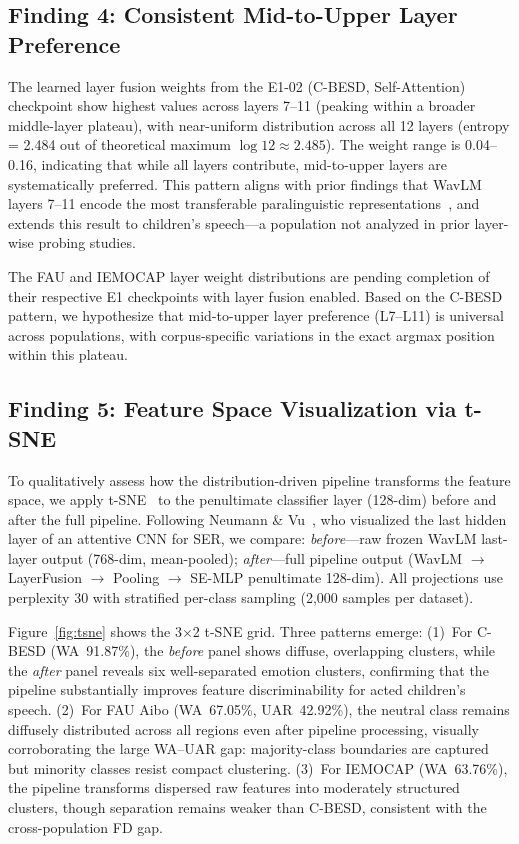 \documentclass[11pt,a4paper]{article}
\begin{document}
\subsection{Finding 4: Consistent Mid-to-Upper Layer Preference}

The learned layer fusion weights from the E1-02 (C-BESD, Self-Attention)
checkpoint show highest values across layers 7--11 (peaking within a broader
middle-layer plateau), with near-uniform
distribution across all 12 layers (entropy = 2.484 out of theoretical maximum
$\log 12 \approx 2.485$). The weight range is 0.04--0.16, indicating that
while all layers contribute, mid-to-upper layers are systematically preferred.
This pattern aligns with prior findings that WavLM layers 7--11 encode the most
transferable paralinguistic representations~\cite{pasad2021layer,
upadhyay2024wavlm,chiu2025probing}, and extends
this result to children's speech---a population not analyzed in prior
layer-wise probing studies.

The FAU and IEMOCAP layer weight distributions are pending completion of their
respective E1 checkpoints with layer fusion enabled. Based on the C-BESD
pattern, we hypothesize that mid-to-upper layer preference (L7--L11) is
universal across populations, with corpus-specific variations in the exact
argmax position within this plateau.

\subsection{Finding 5: Feature Space Visualization via t-SNE}

To qualitatively assess how the distribution-driven pipeline transforms the
feature space, we apply t-SNE~\cite{van2008visualizing} to the penultimate
classifier layer (128-dim) before and after the full pipeline. Following
Neumann \& Vu~\cite{neumann2019cross}, who visualized the last hidden layer of
an attentive CNN for SER, we compare: \textit{before}---raw frozen WavLM
last-layer output (768-dim, mean-pooled); \textit{after}---full pipeline output
(WavLM $\rightarrow$ LayerFusion $\rightarrow$ Pooling $\rightarrow$ SE-MLP
penultimate 128-dim). All projections use perplexity 30 with stratified
per-class sampling (2,000 samples per dataset).

Figure~\ref{fig:tsne} shows the 3$\times$2 t-SNE grid. Three patterns emerge:
(1)~For C-BESD (WA~91.87\%), the \textit{before} panel shows diffuse,
overlapping clusters, while the \textit{after} panel reveals six well-separated
emotion clusters, confirming that the pipeline substantially improves feature
discriminability for acted children's speech. (2)~For FAU Aibo (WA~67.05\%,
UAR~42.92\%), the neutral class remains diffusely distributed across all
regions even after pipeline processing, visually corroborating the large
WA--UAR gap: majority-class boundaries are captured but minority classes resist
compact clustering. (3)~For IEMOCAP (WA~63.76\%), the pipeline transforms
dispersed raw features into moderately structured clusters, though separation
remains weaker than C-BESD, consistent with the cross-population FD gap.
\end{document}
